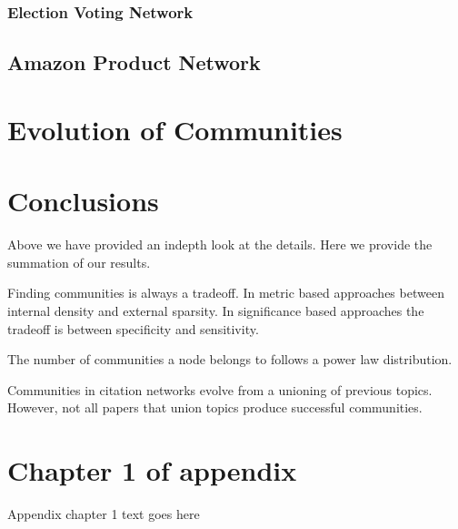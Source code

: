\documentclass[phd,tocprelim]{cornell}
\begin{document}
\subsection{Election Voting Network}



\section{Amazon Product Network}

\chapter{Evolution of Communities}


\chapter{Conclusions}

Above we have provided an indepth look at the details.  Here we provide the summation of our results.

Finding communities is always a tradeoff.  In metric based approaches between internal density and external sparsity.  In significance based approaches the tradeoff is between specificity and sensitivity.

The number of communities a node belongs to follows a power law distribution.

Communities in citation networks evolve from a unioning of previous topics.  However, not all papers that union topics produce successful communities.

\cite{fort}
\cite{porter}
\cite{kanna}
\cite{newman}
\cite{duch}
\cite{blondel}
\cite{mishra}
\cite{jain}
\cite{zhang}
\cite{andersen}
\cite{capocci}
\cite{lanc:2009}
\cite{danon}
\cite{leskovec}
\cite{hui}
\cite{maiya}
\cite{lan:2008}
\cite{hastings}
\cite{leskovec:2008}
\cite{chen}
\cite{lanc:2010}
\cite{girvan}


\appendix
\chapter{Chapter 1 of appendix}
Appendix chapter 1 text goes here


\end{document}
